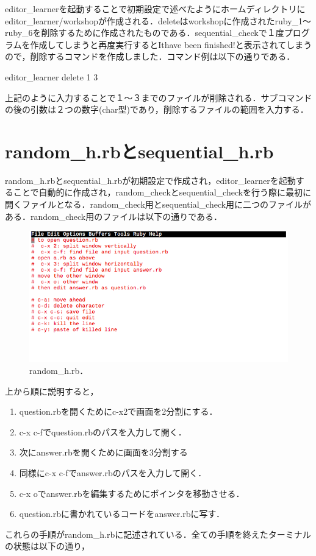     editor\_learnerを起動することで初期設定で述べたようにホームディレクトリにeditor\_learner/workshopが作成される．deleteはworkshopに作成されたruby\_1〜ruby\_6を削除するために作成されたものである．sequential\_checkで１度プログラムを作成してしまうと再度実行するとIthave been finished!と表示されてしまうので，削除するコマンドを作成しました．コマンド例は以下の通りである．
\begin{description}
\item[editor\_learner delete 1 3]
\end{description}
上記のように入力することで１〜３までのファイルが削除される．サブコマンドの後の引数は２つの数字(char型)であり，削除するファイルの範囲を入力する．

    \section{random\_h.rbとsequential\_h.rb}\label{random_h.rbux3068sequential_h.rb}

random\_h.rbとsequential\_h.rbが初期設定で作成され，editor\_learnerを起動することで自動的に作成され，random\_checkとsequential\_checkを行う際に最初に開くファイルとなる．random\_check用とsequential\_check用に二つのファイルがある．random\_check用のファイルは以下の通りである．

\begin{figure}[H]
\centering
\begin{center}
\includegraphics[width=150mm]{../../picture/random_h.png}
\end{center}
\caption{random\_h.rb．\label{random_h}}

\label{fig:}
\end{figure}

上から順に説明すると，
\begin{enumerate}
\def\labelenumi{\arabic{enumi}.}
\tightlist
\item
question.rbを開くためにc-x2で画面を2分割にする．
\item
c-x c-fでquestion.rbのパスを入力して開く． 
\item
次にanswer.rbを開くために画面を3分割する 
\item
同様にc-x c-fでanswer.rbのパスを入力して開く． 
\item
c-x oでanswer.rbを編集するためにポインタを移動させる． 
\item
question.rbに書かれているコードをanswer.rbに写す．
\end{enumerate}
これらの手順がrandom\_h.rbに記述されている．全ての手順を終えたターミナルの状態は以下の通り，

